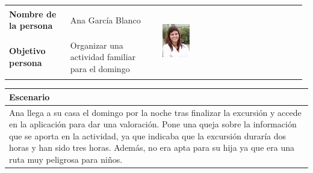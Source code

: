 \documentclass[11pt]{article}
\begin{document}
\begin{table}[H]
  \centering
  \begin{tabular}{p{0.2\linewidth}|p{0.3\linewidth}p{0.475\linewidth}}
    \toprule
    \textbf{Nombre de la persona} & Ana García Blanco &\multirow{2}{*}{\begin{minipage}{1.\textwidth}\includegraphics[width=0.2\textwidth, height=30mm]{Ana}\end{minipage}}\\
    \textbf{Objetivo persona} & Organizar una actividad familiar para el domingo & \\
    \bottomrule
  \end{tabular}

\begin{tabular}{p{1.028\linewidth}}
  \textbf{Escenario}\\
  \midrule
  Ana llega a su casa el domingo por la noche tras finalizar la excursión y accede en la aplicación para dar una valoración. Pone una queja sobre la información que se aporta en la actividad, ya que indicaba que la excursión duraría dos horas y han sido tres horas. Además, no era apta para su hija ya que era una ruta muy peligrosa para niños.
\end{tabular}
\end{table}
\end{document}
